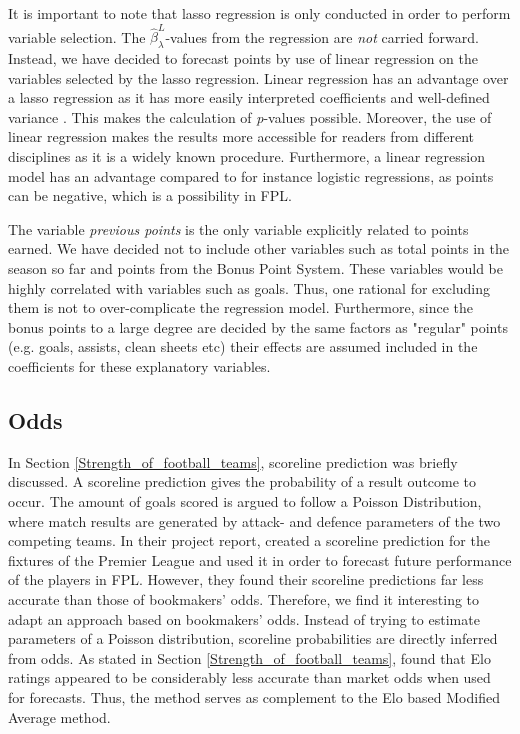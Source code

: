 It is important to note that lasso regression is only conducted in order to perform variable selection. The  $\hat{\beta}_{\lambda}^{L}$-values from the regression are \textit{not} carried forward. Instead, we have decided to forecast points by use of linear regression on the variables selected by the lasso regression. Linear regression has an advantage over a lasso regression as it has more easily interpreted coefficients and well-defined variance \citep{ISLR}. This makes the calculation of \textit{p}-values possible. Moreover, the use of linear regression makes the results more accessible for readers from different disciplines as it is a widely known procedure. Furthermore, a linear regression model has an advantage compared to for instance logistic regressions, as points can be negative, which is a possibility in FPL.

\newpar 

The variable \textit{previous points} is the only variable explicitly related to points earned. We have decided not to include other variables such as total points in the season so far and points from the Bonus Point System. These variables would be highly correlated with variables such as goals. Thus, one rational for excluding them is not to over-complicate the regression model. Furthermore, since the bonus points to a large degree are decided by the same factors as "regular" points (e.g. goals, assists, clean sheets etc) their effects are assumed included in the coefficients for these explanatory variables. 


\subsection{Odds}

In Section \ref{Strength_of_football_teams}, scoreline prediction was briefly discussed. A scoreline prediction gives the probability of a result outcome to occur. The amount of goals scored is argued to follow a Poisson Distribution, where match results are generated by attack- and defence parameters of the two competing teams. In their project report, \cite{Gupta} created a scoreline prediction for the fixtures of the Premier League and used it in order to forecast future performance of the players in FPL. However, they found their scoreline predictions far less accurate than those of bookmakers' odds. Therefore, we find it interesting to adapt an approach based on bookmakers' odds. Instead of trying to estimate parameters of a Poisson distribution, scoreline probabilities are directly inferred from odds. As stated in Section \ref{Strength_of_football_teams}, \cite{Hvattum} found that Elo ratings appeared to be considerably less accurate than market odds when used for forecasts. Thus, the method serves as complement to the Elo based Modified Average method.

